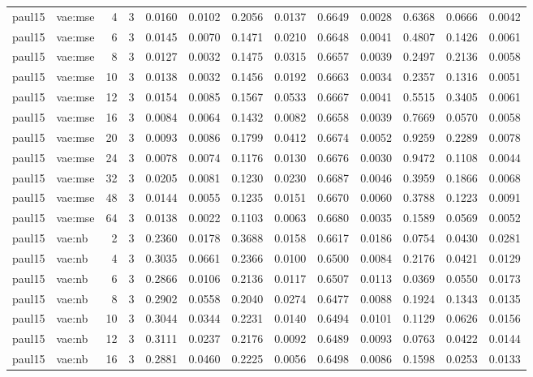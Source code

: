 \begin{tabular}{llrrrrrrrrrrr}
paul15 & vae:mse & 4 & 3 & 0.0160 & 0.0102 & 0.2056 & 0.0137 & 0.6649 & 0.0028 & 0.6368 & 0.0666 & 0.0042 \\
paul15 & vae:mse & 6 & 3 & 0.0145 & 0.0070 & 0.1471 & 0.0210 & 0.6648 & 0.0041 & 0.4807 & 0.1426 & 0.0061 \\
paul15 & vae:mse & 8 & 3 & 0.0127 & 0.0032 & 0.1475 & 0.0315 & 0.6657 & 0.0039 & 0.2497 & 0.2136 & 0.0058 \\
paul15 & vae:mse & 10 & 3 & 0.0138 & 0.0032 & 0.1456 & 0.0192 & 0.6663 & 0.0034 & 0.2357 & 0.1316 & 0.0051 \\
paul15 & vae:mse & 12 & 3 & 0.0154 & 0.0085 & 0.1567 & 0.0533 & 0.6667 & 0.0041 & 0.5515 & 0.3405 & 0.0061 \\
paul15 & vae:mse & 16 & 3 & 0.0084 & 0.0064 & 0.1432 & 0.0082 & 0.6658 & 0.0039 & 0.7669 & 0.0570 & 0.0058 \\
paul15 & vae:mse & 20 & 3 & 0.0093 & 0.0086 & 0.1799 & 0.0412 & 0.6674 & 0.0052 & 0.9259 & 0.2289 & 0.0078 \\
paul15 & vae:mse & 24 & 3 & 0.0078 & 0.0074 & 0.1176 & 0.0130 & 0.6676 & 0.0030 & 0.9472 & 0.1108 & 0.0044 \\
paul15 & vae:mse & 32 & 3 & 0.0205 & 0.0081 & 0.1230 & 0.0230 & 0.6687 & 0.0046 & 0.3959 & 0.1866 & 0.0068 \\
paul15 & vae:mse & 48 & 3 & 0.0144 & 0.0055 & 0.1235 & 0.0151 & 0.6670 & 0.0060 & 0.3788 & 0.1223 & 0.0091 \\
paul15 & vae:mse & 64 & 3 & 0.0138 & 0.0022 & 0.1103 & 0.0063 & 0.6680 & 0.0035 & 0.1589 & 0.0569 & 0.0052 \\
paul15 & vae:nb & 2 & 3 & 0.2360 & 0.0178 & 0.3688 & 0.0158 & 0.6617 & 0.0186 & 0.0754 & 0.0430 & 0.0281 \\
paul15 & vae:nb & 4 & 3 & 0.3035 & 0.0661 & 0.2366 & 0.0100 & 0.6500 & 0.0084 & 0.2176 & 0.0421 & 0.0129 \\
paul15 & vae:nb & 6 & 3 & 0.2866 & 0.0106 & 0.2136 & 0.0117 & 0.6507 & 0.0113 & 0.0369 & 0.0550 & 0.0173 \\
paul15 & vae:nb & 8 & 3 & 0.2902 & 0.0558 & 0.2040 & 0.0274 & 0.6477 & 0.0088 & 0.1924 & 0.1343 & 0.0135 \\
paul15 & vae:nb & 10 & 3 & 0.3044 & 0.0344 & 0.2231 & 0.0140 & 0.6494 & 0.0101 & 0.1129 & 0.0626 & 0.0156 \\
paul15 & vae:nb & 12 & 3 & 0.3111 & 0.0237 & 0.2176 & 0.0092 & 0.6489 & 0.0093 & 0.0763 & 0.0422 & 0.0144 \\
paul15 & vae:nb & 16 & 3 & 0.2881 & 0.0460 & 0.2225 & 0.0056 & 0.6498 & 0.0086 & 0.1598 & 0.0253 & 0.0133 \\

\end{tabular}
